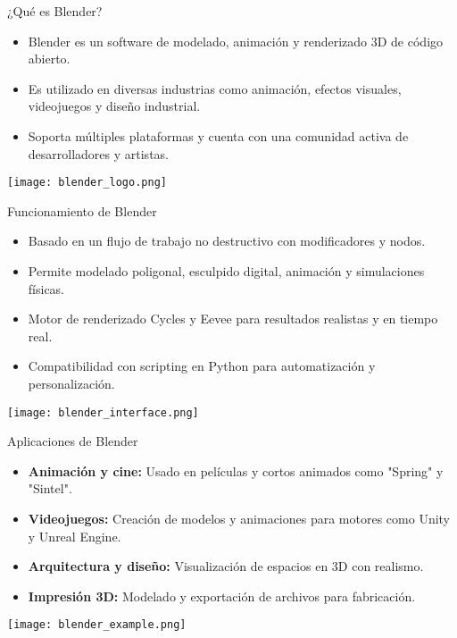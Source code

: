 \begin{frame}{¿Qué es Blender?}
    \begin{itemize}
        \item Blender es un software de modelado, animación y renderizado 3D de código abierto.
        \item Es utilizado en diversas industrias como animación, efectos visuales, videojuegos y diseño industrial.
        \item Soporta múltiples plataformas y cuenta con una comunidad activa de desarrolladores y artistas.
    \end{itemize}
    \begin{center}
        \texttt{[image: blender\_logo.png]}
    \end{center}
\end{frame}

\begin{frame}{Funcionamiento de Blender}
    \begin{itemize}
        \item Basado en un flujo de trabajo no destructivo con modificadores y nodos.
        \item Permite modelado poligonal, esculpido digital, animación y simulaciones físicas.
        \item Motor de renderizado Cycles y Eevee para resultados realistas y en tiempo real.
        \item Compatibilidad con scripting en Python para automatización y personalización.
    \end{itemize}
    \begin{center}
        \texttt{[image: blender\_interface.png]}
    \end{center}
\end{frame}

\begin{frame}{Aplicaciones de Blender}
    \begin{itemize}
        \item \textbf{Animación y cine:} Usado en películas y cortos animados como "Spring" y "Sintel".
        \item \textbf{Videojuegos:} Creación de modelos y animaciones para motores como Unity y Unreal Engine.
        \item \textbf{Arquitectura y diseño:} Visualización de espacios en 3D con realismo.
        \item \textbf{Impresión 3D:} Modelado y exportación de archivos para fabricación.
    \end{itemize}
    \begin{center}
        \texttt{[image: blender\_example.png]}
    \end{center}
\end{frame}
